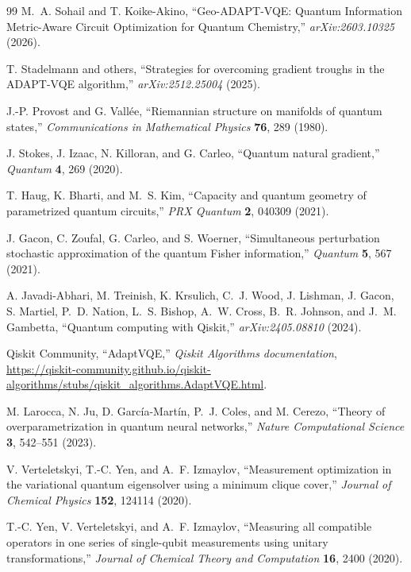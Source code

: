 \documentclass[
  reprint,
  amsmath,
  amssymb,
  aps,
  pra,
  nofootinbib,
  superscriptaddress,
  floatfix
]{revtex4-2}
\begin{document}
\begin{thebibliography}{99}
M.~A. Sohail and T. Koike-Akino,
``Geo-ADAPT-VQE: Quantum Information Metric-Aware Circuit Optimization for Quantum Chemistry,''
\emph{arXiv:2603.10325} (2026).

T. Stadelmann and others,
``Strategies for overcoming gradient troughs in the ADAPT-VQE algorithm,''
\emph{arXiv:2512.25004} (2025).

J.-P. Provost and G. Vall\'ee,
``Riemannian structure on manifolds of quantum states,''
\emph{Communications in Mathematical Physics} \textbf{76}, 289 (1980).

J. Stokes, J. Izaac, N. Killoran, and G. Carleo,
``Quantum natural gradient,''
\emph{Quantum} \textbf{4}, 269 (2020).

T. Haug, K. Bharti, and M.~S. Kim,
``Capacity and quantum geometry of parametrized quantum circuits,''
\emph{PRX Quantum} \textbf{2}, 040309 (2021).

J. Gacon, C. Zoufal, G. Carleo, and S. Woerner,
``Simultaneous perturbation stochastic approximation of the quantum Fisher information,''
\emph{Quantum} \textbf{5}, 567 (2021).

A. Javadi-Abhari, M. Treinish, K. Krsulich, C.~J. Wood, J. Lishman, J. Gacon, S. Martiel, P.~D. Nation, L.~S. Bishop, A.~W. Cross, B.~R. Johnson, and J.~M. Gambetta,
``Quantum computing with Qiskit,''
\emph{arXiv:2405.08810} (2024).

Qiskit Community,
``AdaptVQE,''
\emph{Qiskit Algorithms documentation}, \url{https://qiskit-community.github.io/qiskit-algorithms/stubs/qiskit_algorithms.AdaptVQE.html}.

M. Larocca, N. Ju, D. Garc{\'i}a-Mart{\'i}n, P.~J. Coles, and M. Cerezo,
``Theory of overparametrization in quantum neural networks,''
\emph{Nature Computational Science} \textbf{3}, 542--551 (2023).

V. Verteletskyi, T.-C. Yen, and A.~F. Izmaylov,
``Measurement optimization in the variational quantum eigensolver using a minimum clique cover,''
\emph{Journal of Chemical Physics} \textbf{152}, 124114 (2020).

T.-C. Yen, V. Verteletskyi, and A.~F. Izmaylov,
``Measuring all compatible operators in one series of single-qubit measurements using unitary transformations,''
\emph{Journal of Chemical Theory and Computation} \textbf{16}, 2400 (2020).



\end{thebibliography}
\end{document}
